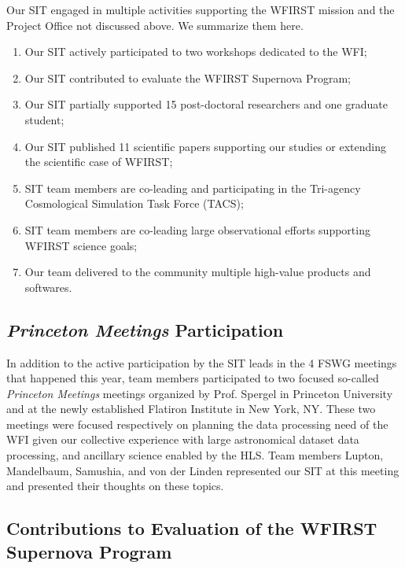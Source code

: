 

\begin{summary}
Our SIT engaged in multiple activities supporting the WFIRST mission and the Project Office not discussed above. We summarize them here.
\begin{enumerate}
\item Our SIT actively participated to two workshops dedicated to the WFI;
\item Our SIT contributed to evaluate the WFIRST Supernova Program;
\item Our SIT partially supported 15 post-doctoral researchers and one graduate student;
\item Our SIT published 11 scientific papers supporting our studies or extending the scientific case of WFIRST;
\item SIT team members are co-leading and participating in the Tri-agency Cosmological Simulation Task Force (TACS);
\item SIT team members are co-leading large observational efforts supporting WFIRST science goals;
\item Our team delivered to the community multiple high-value products and softwares.
\end{enumerate}
\end{summary}


\subsection{\emph{Princeton Meetings} Participation}

In addition to the active participation by the SIT leads in the 4 FSWG meetings that happened this year, team members participated to two focused so-called \emph{Princeton Meetings} meetings organized by Prof. Spergel in Princeton University and at the newly established Flatiron Institute in  New York, NY. These two meetings were focused respectively on planning the data processing need of the WFI given our collective experience with large astronomical dataset data processing, and ancillary science enabled by the HLS. Team members Lupton, Mandelbaum, Samushia, and von der Linden represented our SIT at this meeting and presented their thoughts on these topics.

\subsection{Contributions to Evaluation of the WFIRST Supernova Program}

